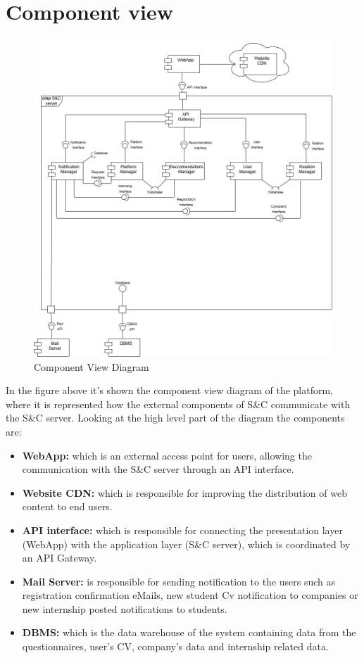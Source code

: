 \section{Component view}
\begin{figure}[H]
    \centering
    \includegraphics[width=\textwidth]{../images/Component_Diagram2.drawio.png}
    \caption{Component View Diagram}
    \label{fig:Component View Diagram}
\end{figure}
In the figure above it's shown the component view diagram of the platform, where it is represented how the external components of S\&C communicate with the S\&C server. Looking at the high level part of the diagram the components are:
\begin{itemize}

    \item{\textbf{WebApp:}} which is an external access point for users, allowing the communication with the S\&C server through an API interface.
    \item{\textbf{Website CDN:}} which is responsible for improving the distribution of web content to end users.
    \item{\textbf{API interface:}} which is responsible for connecting the presentation layer (WebApp) with the application layer (S\&C server), which is coordinated by an API Gateway.
    \item{\textbf{Mail Server:}} is responsible for sending notification to the users such as registration confirmation eMails, new student Cv notification to companies or new internship posted notifications to students.
    \item{\textbf{DBMS:}} which is the data warehouse of the system containing data from the questionnaires, user's CV, company's data and internship related data.
\end{itemize}
